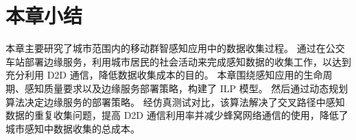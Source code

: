 \section{本章小结}

本章主要研究了城市范围内的移动群智感知应用中的数据收集过程。
通过在公交车站部署边缘服务，利用城市居民的社会活动来完成感知数据的收集工作，以达到充分利用 D2D 通信，降低数据收集成本的目的。
本章围绕感知应用的生命周期、感知质量要求以及边缘服务部署策略，构建了 ILP 模型。
然后通过动态规划算法决定边缘服务的部署策略。
经仿真测试对比，该算法解决了交叉路径中感知数据的重复收集问题，提高 D2D 通信利用率并减少蜂窝网络通信的使用，降低了城市感知中数据收集的总成本。


